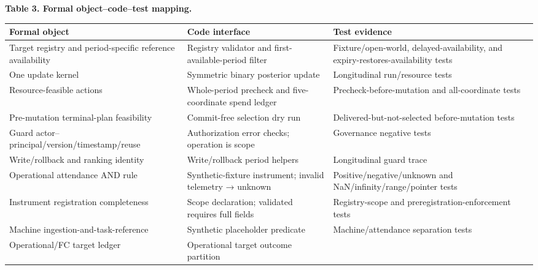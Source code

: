 \documentclass[
  11pt]{article}
\begin{document}
\textbf{Table 3. Formal object--code--test mapping.}

\begin{longtable}[]{@{}
  >{\raggedright\arraybackslash}p{}
  >{\raggedright\arraybackslash}p{}
  >{\raggedright\arraybackslash}p{}@{}}
\toprule\noalign{}
\begin{minipage}[b]{\linewidth}\raggedright
Formal object
\end{minipage} & \begin{minipage}[b]{\linewidth}\raggedright
Code interface
\end{minipage} & \begin{minipage}[b]{\linewidth}\raggedright
Test evidence
\end{minipage} \\
\midrule\noalign{}
\endhead
\bottomrule\noalign{}
\endlastfoot
Target registry and period-specific reference availability & Registry
validator and first-available-period filter & Fixture/open-world,
delayed-availability, and expiry-restores-availability tests \\
One update kernel & Symmetric binary posterior update & Longitudinal
run/resource tests \\
Resource-feasible actions & Whole-period precheck and five-coordinate
spend ledger & Precheck-before-mutation and all-coordinate tests \\
Pre-mutation terminal-plan feasibility & Commit-free selection dry run &
Delivered-but-not-selected before-mutation tests \\
Guard actor--principal/version/timestamp/reuse & Authorization error
checks; operation is scope & Governance negative tests \\
Write/rollback and ranking identity & Write/rollback period helpers &
Longitudinal guard trace \\
Operational attendance AND rule & Synthetic-fixture instrument; invalid
telemetry → unknown & Positive/negative/unknown and
NaN/infinity/range/pointer tests \\
Instrument registration completeness & Scope declaration; validated
requires full fields & Registry-scope and preregistration-enforcement
tests \\
Machine ingestion-and-task-reference & Synthetic placeholder predicate &
Machine/attendance separation tests \\
Operational/FC target ledger & Operational target outcome partition &

\end{longtable}
\end{document}
